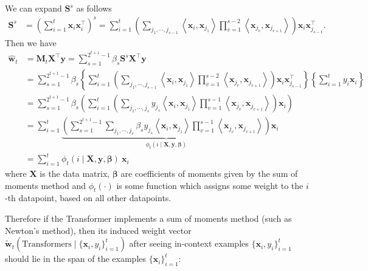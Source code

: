 \documentclass[11pt]{article}
\theoremstyle{plain}
\theoremstyle{definition}
\theoremstyle{remark}
\renewcommand{\^}[1]{^{(#1)}}
\newcommand{\bx}{\boldsymbol{x}}
\newcommand{\bX}{\boldsymbol{X}}
\newcommand{\bM}{\boldsymbol{M}}
\newcommand{\by}{\boldsymbol{y}}
\newcommand{\bS}{\boldsymbol{S}}
\newcommand{\bw}{\boldsymbol{w}}
\newcommand{\bbeta}{\boldsymbol{\beta}}
\newcommand{\inner}[1]{ \left\langle {#1} \right\rangle }
\begin{document}
We can expand $\bS^s$ as follows
\begin{equation}
    \begin{aligned}
        \bS^s &= \left(\sum_{i=1}^t \bx_i \bx_i^\top\right)^s = \sum_{i=1}^t \left(\sum_{{j_1}, \cdots, {j_{s-1}}} \inner{\bx_i, \bx_{j_1}} \prod_{v=1}^{s-2} \inner{\bx_{j_{v}}, \bx_{j_{v+1}}}\right) \bx_i \bx_{j_{s-1}}^\top. 
    \end{aligned}
\end{equation}
Then we have 
\begin{equation}
    \begin{aligned}
        \hat{\bw}_t &=\bM_t \bX^\top \by  = \sum_{s=1}^{2^{t+1} - 1} \beta_s \bS^s \bX^\top \by  \\
        &=  \sum_{s=1}^{2^{t+1} - 1} \beta_s \left\{\sum_{i=1}^t \left(\sum_{{j_1}, \cdots, {j_{s-1}}} \inner{\bx_i, \bx_{j_1}} \prod_{v=1}^{s-2} \inner{\bx_{j_{v}}, \bx_{j_{v+1}}}\right) \bx_i \bx_{j_{s-1}}^\top \right\} \left\{\sum_{i=1}^t y_i \bx_i \right\} \\
        &= \sum_{s=1}^{2^{t+1} - 1} \beta_s \left(\sum_{i=1}^t \left(\sum_{{j_1}, \cdots, {j_{s}}} y_{j_s} \inner{\bx_i, \bx_{j_1}} \prod_{v=1}^{s-1} \inner{\bx_{j_{v}}, \bx_{j_{v+1}}}\right) \bx_i \right) \\
        &= \sum_{i=1}^t \underbrace{\left(\sum_{s=1}^{2^{t+1} - 1} \sum_{{j_1}, \cdots, {j_{s}}}  \beta_s y_{j_s} \inner{\bx_i, \bx_{j_1}} \prod_{v=1}^{s-1} \inner{\bx_{j_{v}}, \bx_{j_{v+1}}} \right)}_{\phi_t(i \mid \bX, \by, \bbeta)} \bx_i \\
        &= \sum_{i=1}^t \phi_t(i \mid \bX, \by, \bbeta) ~ \bx_i
    \end{aligned}
\end{equation}
where $\bX$ is  the data matrix, $\bbeta$  are coefficients of moments given by the sum of moments method and $\phi_t(\cdot)$ is some function which assigns some weight to the $i$-th datapoint, based on all other datapoints.

Therefore if the Transformer implements a sum of moments method (such as Newton's method), then its induced weight vector $\tilde{\bw}_t(\mathrm{Transformers} \mid \{\bx_i, y_i\}_{i=1}^t)$ after seeing in-context examples $\{\bx_i, y_i\}_{i=1}^t$  should lie in the span of the examples $\{\bx_i\}_{i=1}^t$:
\end{document}
